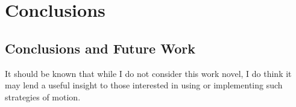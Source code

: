 \chapter{Conclusions}
\label{conclusions}


\clearpage
\section{Conclusions and Future Work}
It should be known that while I do not consider this work novel, I do think it may lend a useful insight to those interested in using or implementing such strategies of motion.

